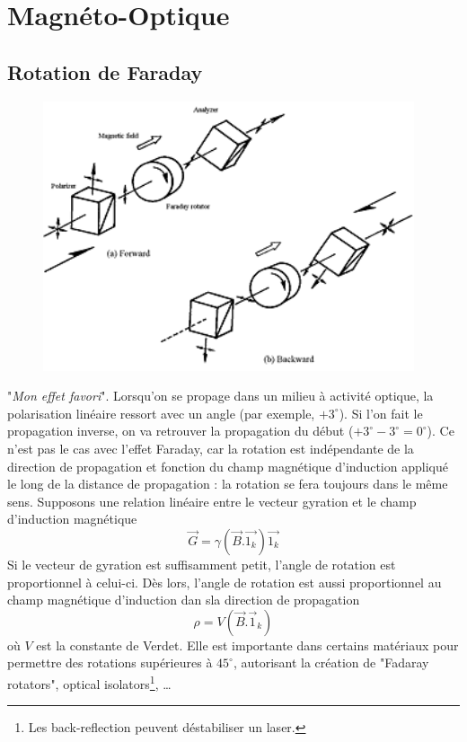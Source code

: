 \newpage
\section{Magnéto-Optique}
\subsection{Rotation de Faraday}
	\begin{figure}
	\vspace{-5mm}
	\includegraphics[scale=0.5]{ch6/image7}
	\end{figure}
"\textit{Mon effet favori}". Lorsqu'on se propage dans un milieu à activité optique, la polarisation linéaire
ressort avec un angle (par exemple, $+3^\circ$). Si l'on fait le propagation inverse, on va retrouver la propagation 
du début ($+3^\circ-3^\circ=0^\circ$). Ce n'est pas le cas avec l'effet Faraday, car la rotation est indépendante
de la direction de propagation et fonction du champ magnétique d'induction appliqué le long de la distance de 
propagation : la rotation se fera toujours dans le même sens. Supposons une relation linéaire entre le vecteur 
gyration et le champ d'induction magnétique
\begin{equation}
\vec G = \gamma(\vec{B}.\vec{1_k})\vec{1_k}
\end{equation}
Si le vecteur de gyration est suffisamment petit, l'angle de rotation est proportionnel à celui-ci. Dès lors, 
l'angle de rotation est aussi proportionnel au champ magnétique d'induction dan sla direction de propagation
\begin{equation}
\rho = V(\vec{B}.\vec{1}_k)
\end{equation}
où $V$ est la constante de Verdet. Elle est importante dans certains matériaux pour permettre des rotations 
supérieures à $45^\circ$, autorisant la création de "Fadaray rotators", optical isolators\footnote{Les 
back-reflection peuvent déstabiliser un laser.}, \dots 


